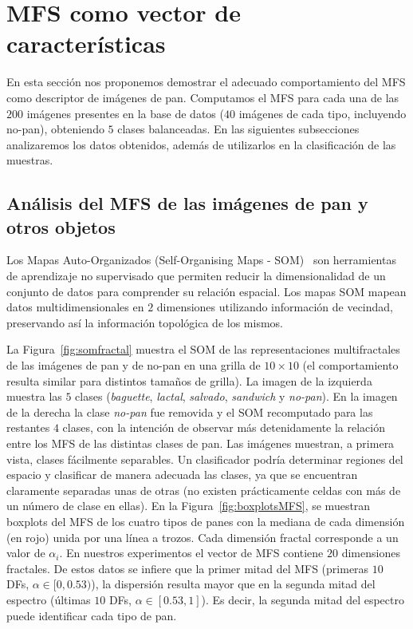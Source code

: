 \section{MFS como vector de características}

En esta sección nos proponemos demostrar el adecuado comportamiento del MFS como descriptor de imágenes de pan.
Computamos el MFS para cada una de las $200$ imágenes presentes en la base de datos ($40$ imágenes de cada tipo, incluyendo no-pan), obteniendo $5$ clases balanceadas.
En las siguientes subsecciones analizaremos los datos obtenidos, además de utilizarlos en la clasificación de las muestras.

\subsection{Análisis del MFS de las imágenes de pan y otros objetos}

Los Mapas Auto-Organizados (Self-Organising Maps -  \acrshort{SOM})~\cite{Kohonen2001} son herramientas de aprendizaje no supervisado que permiten reducir la dimensionalidad de un conjunto de datos para comprender su relación espacial.
Los mapas SOM mapean datos multidimensionales en $2$ dimensiones utilizando información de vecindad, preservando así la información topológica de los mismos.

La Figura~\ref{fig:somfractal} muestra el  SOM de las representaciones multifractales de las imágenes de pan y de no-pan en una grilla de $10\times 10$ (el comportamiento resulta similar para distintos tamaños de grilla).
La imagen de la izquierda muestra las $5$ clases ({\em baguette}, {\em lactal}, {\em salvado}, {\em sandwich} y {\em no-pan}).
En la imagen de la derecha la clase {\em no-pan} fue removida y el SOM recomputado para las restantes $4$ clases, con la intención de observar más detenidamente la relación entre los MFS de las distintas clases de pan.
Las imágenes muestran, a primera vista, clases fácilmente separables.
Un clasificador podría determinar regiones del espacio y clasificar de manera adecuada las clases, ya que se encuentran claramente separadas unas de otras (no existen prácticamente celdas con más de un número de clase en ellas).
En la Figura~\ref{fig:boxplotsMFS}, se muestran boxplots del MFS de los cuatro tipos de panes con la mediana de cada dimensión (en rojo) unida por una línea a trozos.
Cada dimensión fractal corresponde a un valor de $\alpha_{i}$.
En nuestros experimentos el vector de MFS contiene $20$ dimensiones fractales. De estos datos se infiere que la primer mitad del MFS (primeras $10$ DFs, $\alpha \in [0,0.53)$), la dispersión resulta mayor que en la segunda mitad del espectro  (últimas $10$ DFs, $\alpha \in [0.53,1]$).
Es decir, la segunda mitad del espectro puede identificar cada tipo de pan.


